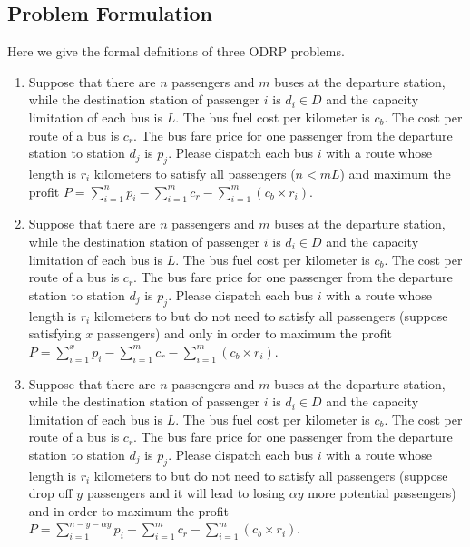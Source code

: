 \documentclass{llncs}
\begin{document}
\subsection{Problem Formulation}
Here we give the formal defnitions of three ODRP problems.
\begin{enumerate}
	\item Suppose that there are $n$ passengers and $m$ buses at the departure station, while the destination station of passenger $i$ is $d_i\in D$ and the capacity limitation of each bus is $L$. The bus fuel cost per kilometer is $c_b$. The cost per route of a bus is $c_r$. The bus fare price for one passenger from the departure station to station $d_j$ is $p_j$. Please dispatch each bus $i$ with a route whose length is $r_i$ kilometers to satisfy all passengers ($n < mL$) and maximum the profit $P = \sum_{i=1}^{n}p_i -\sum_{i=1}^{m}c_r - \sum_{i=1}^{m}(c_b\times r_i)$.
	
	\item Suppose that there are $n$ passengers and $m$ buses at the departure station, while the destination station of passenger $i$ is $d_i\in D$ and the capacity limitation of each bus is $L$. The bus fuel cost per kilometer is $c_b$. The cost per route of a bus is $c_r$. The bus fare price for one passenger from the departure station to station $d_j$ is $p_j$. Please dispatch each bus $i$ with a route whose length is $r_i$ kilometers to but do not need to satisfy all passengers (suppose satisfying $x$ passengers) and only in order to maximum the profit $P = \sum_{i=1}^{x}p_i -\sum_{i=1}^{m}c_r - \sum_{i=1}^{m}(c_b\times r_i)$.
	
	\item Suppose that there are $n$ passengers and $m$ buses at the departure station, while the destination station of passenger $i$ is $d_i\in D$ and the capacity limitation of each bus is $L$. The bus fuel cost per kilometer is $c_b$. The cost per route of a bus is $c_r$. The bus fare price for one passenger from the departure station to station $d_j$ is $p_j$. Please dispatch each bus $i$ with a route whose length is $r_i$ kilometers to but do not need to satisfy all passengers (suppose drop off $y$ passengers and it will lead to losing $\alpha y$ more potential passengers) and  in order to maximum the profit $P = \sum_{i=1}^{n-y-\alpha y}p_i -\sum_{i=1}^{m}c_r - \sum_{i=1}^{m}(c_b\times r_i)$.
	
\end{enumerate}
\end{document}
